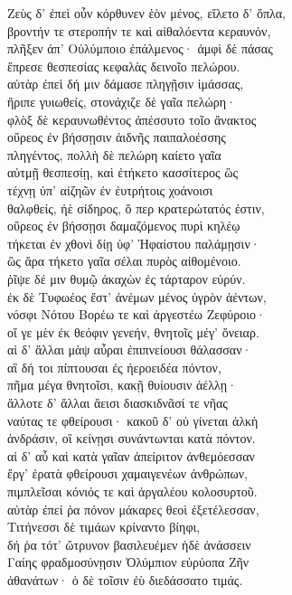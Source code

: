 \begin{pages}
\begin{Leftside}
\quad{}Ζεὺς δ' ἐπεὶ οὖν κόρθυνεν ἑὸν μένος, εἵλετο δ' ὅπλα,\\
βροντήν τε στεροπήν τε καὶ αἰθαλόεντα κεραυνόν,\\
πλῆξεν ἀπ' Οὐλύμποιο ἐπάλμενος· ἀμφὶ δὲ πάσας \\
ἔπρεσε θεσπεσίας κεφαλὰς δεινοῖο πελώρου.\\
αὐτὰρ ἐπεὶ δή μιν δάμασε πληγῇσιν ἱμάσσας,\\
ἤριπε γυιωθείς, στονάχιζε δὲ γαῖα πελώρη· \\
φλὸξ δὲ κεραυνωθέντος ἀπέσσυτο τοῖο ἄνακτος\\
οὔρεος ἐν βήσσῃσιν ἀιδνῆς παιπαλοέσσης \\
πληγέντος, πολλὴ δὲ πελώρη καίετο γαῖα \\
αὐτμῇ θεσπεσίῃ, καὶ ἐτήκετο κασσίτερος ὣς\\
τέχνῃ ὑπ' αἰζηῶν ἐν ἐυτρήτοις χοάνοισι\\
θαλφθείς, ἠὲ σίδηρος, ὅ περ κρατερώτατός ἐστιν, \\
οὔρεος ἐν βήσσῃσι δαμαζόμενος πυρὶ κηλέῳ \\
τήκεται ἐν χθονὶ δίῃ ὑφ' Ἡφαίστου παλάμῃσιν· \\
ὣς ἄρα τήκετο γαῖα σέλαι πυρὸς αἰθομένοιο.\\
ῥῖψε δέ μιν θυμῷ ἀκαχὼν ἐς τάρταρον εὐρύν. \\

\quad{}ἐκ δὲ Τυφωέος ἔστ' ἀνέμων μένος ὑγρὸν ἀέντων,\\
νόσφι Νότου Βορέω τε καὶ ἀργεστέω Ζεφύροιο· \\
οἵ γε μὲν ἐκ θεόφιν γενεήν, θνητοῖς μέγ' ὄνειαρ.\\
αἱ δ' ἄλλαι μὰψ αὖραι ἐπιπνείουσι θάλασσαν·\\
αἳ δή τοι πίπτουσαι ἐς ἠεροειδέα πόντον,\\
πῆμα μέγα θνητοῖσι, κακῇ θυίουσιν ἀέλλῃ· \\
ἄλλοτε δ' ἄλλαι ἄεισι διασκιδνᾶσί τε νῆας \\
ναύτας τε φθείρουσι· κακοῦ δ' οὐ γίνεται ἀλκὴ \\
ἀνδράσιν, οἳ κείνῃσι συνάντωνται κατὰ πόντον. \\
αἱ δ' αὖ καὶ κατὰ γαῖαν ἀπείριτον ἀνθεμόεσσαν\\
ἔργ' ἐρατὰ φθείρουσι χαμαιγενέων ἀνθρώπων, \\
πιμπλεῖσαι κόνιός τε καὶ ἀργαλέου κολοσυρτοῦ. \\[5pt]

αὐτὰρ ἐπεί ῥα πόνον μάκαρες θεοὶ ἐξετέλεσσαν, \\
Τιτήνεσσι δὲ τιμάων κρίναντο βίηφι,\\
δή ῥα τότ' ὤτρυνον βασιλευέμεν ἠδὲ ἀνάσσειν\\
Γαίης φραδμοσύνῃσιν Ὀλύμπιον εὐρύοπα Ζῆν\\
ἀθανάτων· ὁ δὲ τοῖσιν ἐὺ διεδάσσατο τιμάς. \\


\end{Leftside}
\end{pages}
